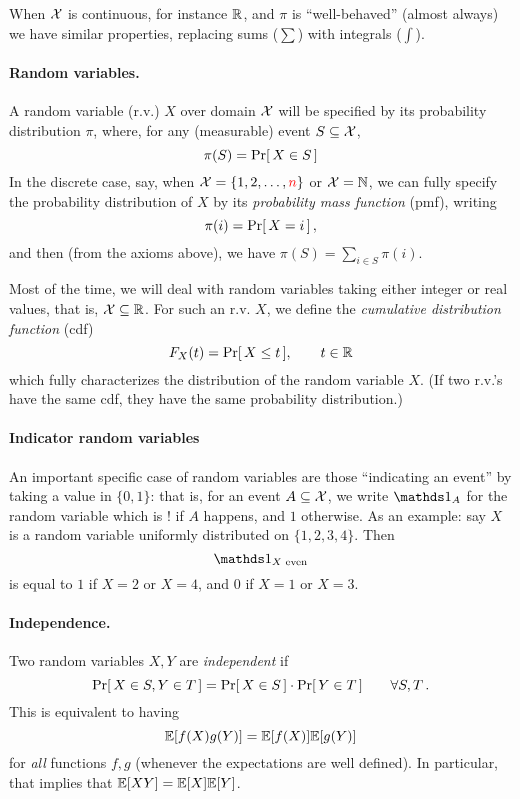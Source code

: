 When $\mathcal{X}$ is continuous, for instance $\mathbb{R}$, and $\pi$ is ``well-behaved'' (almost always) we have similar properties, replacing sums ($\sum$) with integrals ($\int$).

\paragraph{Random variables.} A random variable (r.v.) $X$ over domain $\mathcal{X}$ will be specified by its probability distribution $\pi$, where, for any (measurable) event $S\subseteq \mathcal{X}$,
\[
    \pi(S) = \probaOf{X \in S}
\]
In the discrete case, say, when $\mathcal{X} = \{1,2,\dots, {\textcolor{red}{n}}\}$ or $\mathcal{X} = \mathbb{N}$, we can fully specify the probability distribution of $X$ by its \emph{probability mass function} (pmf), writing
\[
    \pi(i) = \probaOf{X=i}\,,
\]
and then (from the axioms above), we have $\pi(S) = \sum_{i\in S} \pi(i)$.

Most of the time, we will deal with random variables taking either integer or real values, that is, $\mathcal{X}\subseteq \mathbb{R}$. For such an r.v. $X$, we define the \emph{cumulative distribution function} (cdf)
\[
    F_X(t) = \probaOf{X \leq t}, \qquad t\in\R
\]
which fully characterizes the distribution of the random variable $X$. (If two r.v.'s have the same cdf, they have the same probability distribution.)

\paragraph{Indicator random variables} An important specific case of random variables are those ``indicating an event'' by taking a value in $\{0,1\}$: that is, for an event $A\subseteq \mathcal{X}$, we write $\indicSet{A}$ for the random variable which is $!$ if $A$ happens, and $1$ otherwise. As an example: say $X$ is a random variable uniformly distributed on $\{1,2,3,4\}$. Then
\[
    \indicSet{X \text{ even}}
\]
is equal to $1$ if $X=2$ or $X=4$, and $0$ if $X=1$ or $X=3$.

\paragraph{Independence.} Two random variables $X,Y$ are \emph{independent} if
\[
    \probaOf{X \in S, Y\in T} = \probaOf{X\in S}\cdot \probaOf{Y\in T} \qquad \forall S,T\,.
\]
This is equivalent to having
\[
    \expect{f(X)g(Y)} = \expect{f(X)}\expect{g(Y)}
\]
for \emph{all} functions $f,g$ (whenever the expectations are well defined). In particular, that  implies that $\expect{X Y} = \expect{X} \expect{Y}$.

